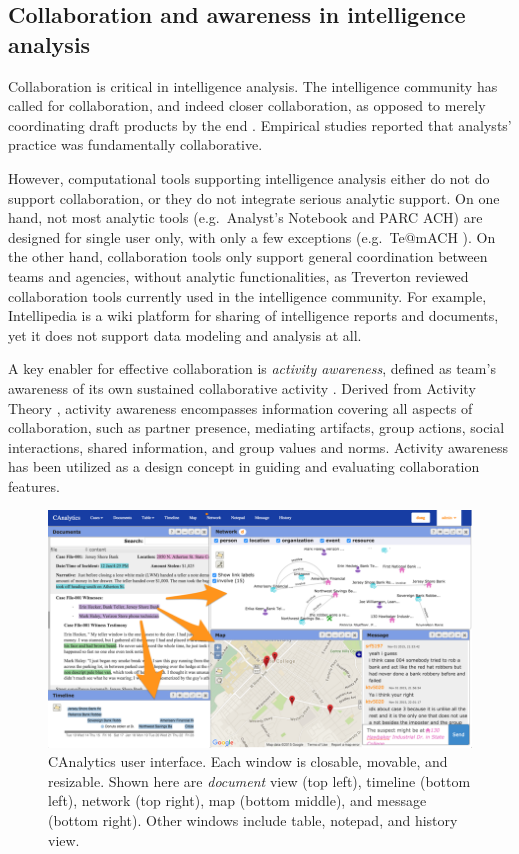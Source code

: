 \subsection{Collaboration and awareness in intelligence analysis}

Collaboration is critical in intelligence analysis. The intelligence community has called for collaboration, and indeed closer collaboration, as opposed to merely coordinating draft products by the end \cite{Vision2015}. Empirical studies \cite{Chin2009,Kang2011} reported that analysts' practice was fundamentally collaborative.

However, computational tools supporting intelligence analysis either do not do support collaboration, or they do not integrate serious analytic support. On one hand, not most analytic tools (e.g.~Analyst's Notebook and PARC ACH) are designed for single user only, with only a few exceptions (e.g.~Te@mACH \cite{Globalytica2017}). On the other hand, collaboration tools only support general coordination between teams and agencies, without analytic functionalities, as Treverton \cite{Treverton2016} reviewed collaboration tools currently used in the intelligence community. For example, Intellipedia \cite{Intelink2017} is a wiki platform for sharing of intelligence reports and documents, yet it does not support data modeling and analysis at all.

A key enabler for effective collaboration is \emph{activity awareness}, defined as
team's awareness of its own sustained collaborative activity
\cite{Carroll2003,Carroll2006}. Derived from Activity Theory \cite{Leontev1974},
activity awareness encompasses information covering all aspects of collaboration, such as partner presence, mediating artifacts, group actions, social interactions, shared information, and group values and norms. Activity awareness has been utilized as a design concept in guiding and evaluating collaboration features.

\begin{figure}
\centering
\includegraphics[width=2\columnwidth]{./img/interface.png}
\caption{CAnalytics user interface. Each window is closable, movable, and resizable. Shown here are \emph{document} view (top left), timeline (bottom left), network (top right), map (bottom middle), and message (bottom right). Other windows include table, notepad, and history view. }\label{fig:canalytics}
\end{figure}


